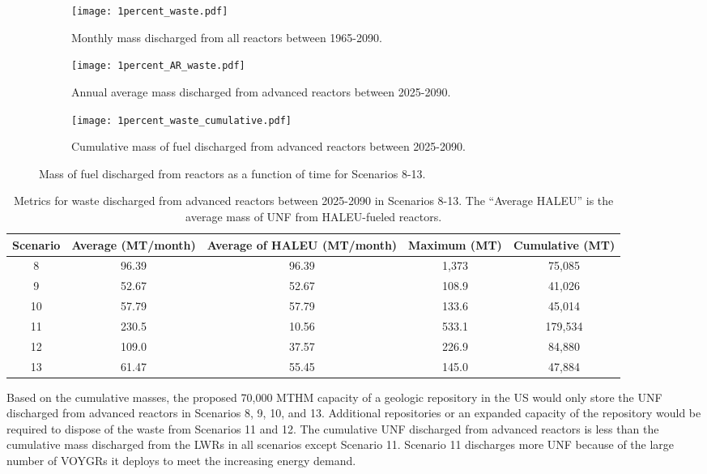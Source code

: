 \begin{figure}[h!]
    \centering
    \begin{subfigure}[b]{0.45\textwidth}
        \centering
        \texttt{[image: 1percent\_waste.pdf]}
        \caption{Monthly mass discharged from all reactors between 
        1965-2090.}
        \label{fig:1percent_all_waste}
    \end{subfigure}
    \hfill
    \begin{subfigure}[b]{0.45\textwidth}
        \centering
        \texttt{[image: 1percent\_AR\_waste.pdf]}
        \caption{Annual average mass discharged from advanced reactors 
        between 2025-2090.}
        \label{fig:1percent_AR_waste}
    \end{subfigure}
    \begin{subfigure}[b]{0.45\textwidth}
        \centering
        \texttt{[image: 1percent\_waste\_cumulative.pdf]}
        \caption{Cumulative mass of fuel discharged from advanced reactors 
        between 2025-2090.}
        \label{fig:1percent_waste_cumulative}
    \end{subfigure}
       \caption{Mass of fuel discharged from reactors 
       as a function of time for Scenarios 8-13. }
       \label{fig:1percent_waste}
\end{figure}

\begin{table}[h!]
    \centering 
    \caption{Metrics for waste discharged from advanced reactors 
    between 2025-2090 in Scenarios 8-13. The ``Average \gls{HALEU}''
    is the average mass of \gls{UNF} from \gls{HALEU}-fueled 
    reactors. }
    \label{tab:1percent_waste}
    \begin{tabular}{c c c c c}
        \hline
        Scenario & Average (MT/month) & Average of \gls{HALEU} (MT/month) 
        & Maximum (MT) & Cumulative (MT)\\\hline
        8 & 96.39 & 96.39 & 1,373 & 75,085 \\
        9 & 52.67 & 52.67 & 108.9 & 41,026 \\
        10 & 57.79 & 57.79 & 133.6 & 45,014 \\
        11 & 230.5 & 10.56 & 533.1 & 179,534 \\
        12 & 109.0 & 37.57 & 226.9 & 84,880 \\
        13 & 61.47 & 55.45 & 145.0 & 47,884 \\
        \hline
    \end{tabular}
\end{table}

Based on the cumulative masses, the proposed 70,000 MTHM capacity of 
a geologic repository in the US would only store the \gls{UNF} 
discharged from advanced reactors in Scenarios 8, 9, 10, and 13. Additional 
repositories or an expanded capacity of the repository would be required 
to dispose of the waste from Scenarios 11 and 12. The 
cumulative \gls{UNF} discharged from advanced reactors is less than the 
cumulative mass discharged from the \glspl{LWR} in all scenarios except 
Scenario 11. Scenario 11 discharges more \gls{UNF} because of the large 
number of VOYGRs it deploys to meet the increasing energy demand. 

